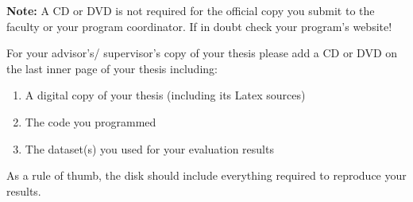 \textbf{Note:} A CD or DVD is not required for the official copy you submit to the faculty or your program coordinator.
If in doubt check your program's website!

\vspace{0.5cm}

For your advisor's/ supervisor's copy of your thesis please add a CD or DVD on the last inner page of your thesis including:

\begin{enumerate}
    \item A digital copy of your thesis (including its Latex sources)
    \item The code you programmed
    \item The dataset(s) you used for your evaluation results
\end{enumerate}

As a rule of thumb, the disk should include everything required to reproduce your results.
